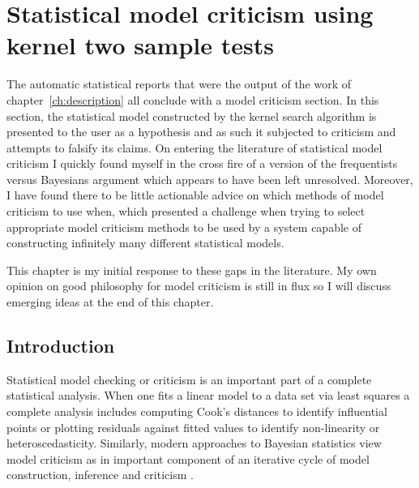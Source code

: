 
\inbpdocument

\chapter{Statistical model criticism using kernel two sample tests}
\label{ch:criticism}

The automatic statistical reports that were the output of the work of chapter~\ref{ch:description} all conclude with a model criticism section.
In this section, the statistical model constructed by the kernel search algorithm is presented to the user as a hypothesis and as such it subjected to criticism and attempts to falsify its claims.
On entering the literature of statistical model criticism I quickly found myself in the cross fire of a version of the frequentists versus Bayesians argument which appears to have been left unresolved.
Moreover, I have found there to be little actionable advice on which methods of model criticism to use when, which presented a challenge when trying to select appropriate model criticism methods to be used by a system capable of constructing infinitely many different statistical models.

This chapter is my initial response to these gaps in the literature.
My own opinion on good philosophy for model criticism is still in flux so I will discuss emerging ideas at the end of this chapter.

\section{Introduction}

Statistical model checking or criticism\footnotemark{} is an important part of a complete statistical analysis.
When one fits a linear model to a data set via least squares a complete analysis includes computing \eg Cook's distances \citep{Cook1982-ia} to identify influential points or plotting residuals against fitted values to identify non-linearity or heteroscedasticity.
Similarly, modern approaches to Bayesian statistics view model criticism as in important component of an iterative cycle of model construction, inference and criticism \citep[e.g.][]{Gelman2013-st, Blei2014-uz}.

